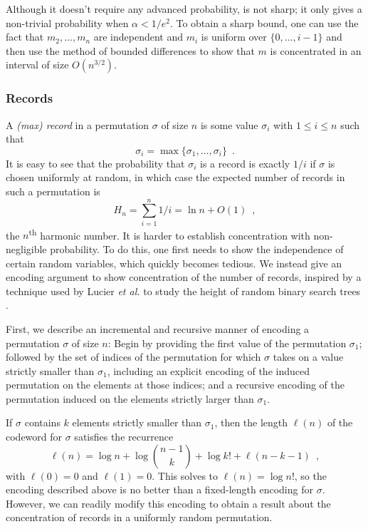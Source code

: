\documentclass{patmorin}
\begin{document}
\begin{rem}
  Although it doesn't require any advanced probability,
   is not sharp; it only gives a non-trivial
  probability when $\alpha < 1/e^2$.  To obtain a sharp bound, one can
  use the fact that $m_2,\ldots,m_n$ are independent and $m_i$ is
  uniform over $\{0,\ldots,i-1\}$ and then use the method of bounded
  differences \cite{mcdiarmid:on} to show that $m$ is concentrated in
  an interval of size $O(n^{3/2})$.
\end{rem}

\subsubsection{Records}

A \emph{(max) record} in a permutation $\sigma$ of size $n$ is some
value $\sigma_i$ with $1 \leq i \leq n$ such that
\[
  \sigma_i = \max\{\sigma_1, \dots, \sigma_i\} \enspace .
\]
It is easy to see that the probability that $\sigma_i$ is a record is
exactly $1/i$ if $\sigma$ is chosen uniformly at random, in which case
the expected number of records in such a permutation is
\[
  H_n = \sum_{i = 1}^n 1/i = \ln n + O(1) \enspace ,
\]
the $n$\textsuperscript{th} harmonic number. It is harder to establish
concentration with non-negligible probability. To do this, one first
needs to show the independence of certain random variables, which
quickly becomes tedious. We instead give an encoding argument to show
concentration of the number of records, inspired by a technique used
by Lucier \emph{et al.} to study the height of random binary search
trees \cite{lucier.jiang.li:quicksort}.

First, we describe an incremental and recursive manner of encoding a
permutation $\sigma$ of size $n$: Begin by providing the first value
of the permutation $\sigma_1$; followed by the set of indices of the
permutation for which $\sigma$ takes on a value strictly smaller than
$\sigma_1$, including an explicit encoding of the induced permutation
on the elements at those indices; and a recursive encoding of the
permutation induced on the elements strictly larger than $\sigma_1$.

If $\sigma$ contains $k$ elements strictly smaller than $\sigma_1$,
then the length $\ell(n)$ of the codeword for $\sigma$ satisfies the
recurrence
\[
  \ell(n) = \log n + \log \binom{n - 1}{k} + \log k! + \ell(n - k - 1) \enspace ,
\]
with $\ell(0) = 0$ and $\ell(1) = 0$. This solves to $\ell(n) = \log
n!$, so the encoding described above is no better than a fixed-length
encoding for $\sigma$. However, we can readily modify this encoding to
obtain a result about the concentration of records in a uniformly
random permutation.
\end{document}
